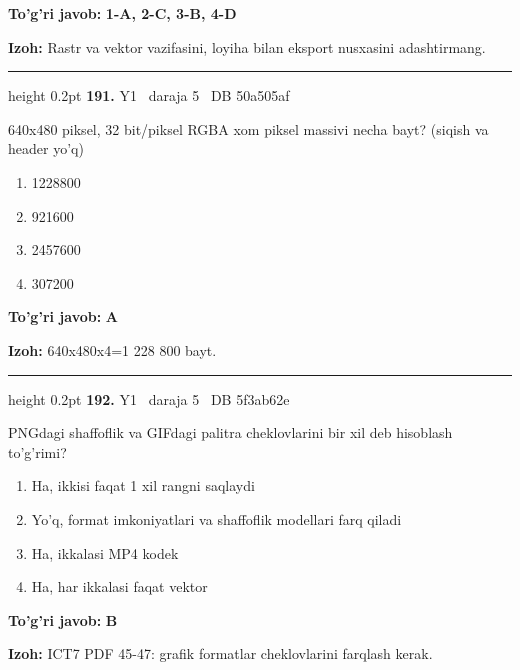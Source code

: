 \documentclass[10pt,a4paper,oneside]{article}
\begin{document}
\begin{tcolorbox}[enhanced,breakable,colback=teal!4,colframe=teal!45!black,boxrule=0.45pt,arc=1.2mm,left=2.8mm,right=2.8mm,top=2mm,bottom=2mm,before skip=2mm,after skip=2mm]
\textbf{\color{teal}To'g'ri javob:} \textbf{1-A, 2-C, 3-B, 4-D}
\par\smallskip
\textbf{Izoh:} Rastr va vektor vazifasini, loyiha bilan eksport nusxasini adashtirmang.
\end{tcolorbox}
\vspace{2mm}\hrule height 0.2pt \vspace{4mm}
\hypertarget{q191}{\textbf{\color{ink}191.}}  {\color{muted}\scriptsize Y1 \textbullet\ daraja 5 \textbullet\ DB 50a505af}
\par
640x480 piksel, 32 bit/piksel RGBA xom piksel massivi necha bayt? (siqish va header yo'q)
\begin{enumerate}[label=\Alph*),leftmargin=9mm]
\item 1228800
\item 921600
\item 2457600
\item 307200
\end{enumerate}
\begin{tcolorbox}[enhanced,breakable,colback=teal!4,colframe=teal!45!black,boxrule=0.45pt,arc=1.2mm,left=2.8mm,right=2.8mm,top=2mm,bottom=2mm,before skip=2mm,after skip=2mm]
\textbf{\color{teal}To'g'ri javob:} \textbf{A}
\par\smallskip
\textbf{Izoh:} 640x480x4=1 228 800 bayt.
\end{tcolorbox}
\vspace{2mm}\hrule height 0.2pt \vspace{4mm}
\hypertarget{q192}{\textbf{\color{ink}192.}}  {\color{muted}\scriptsize Y1 \textbullet\ daraja 5 \textbullet\ DB 5f3ab62e}
\par
PNGdagi shaffoflik va GIFdagi palitra cheklovlarini bir xil deb hisoblash to'g'rimi?
\begin{enumerate}[label=\Alph*),leftmargin=9mm]
\item Ha, ikkisi faqat 1 xil rangni saqlaydi
\item Yo'q, format imkoniyatlari va shaffoflik modellari farq qiladi
\item Ha, ikkalasi MP4 kodek
\item Ha, har ikkalasi faqat vektor
\end{enumerate}
\begin{tcolorbox}[enhanced,breakable,colback=teal!4,colframe=teal!45!black,boxrule=0.45pt,arc=1.2mm,left=2.8mm,right=2.8mm,top=2mm,bottom=2mm,before skip=2mm,after skip=2mm]
\textbf{\color{teal}To'g'ri javob:} \textbf{B}
\par\smallskip
\textbf{Izoh:} ICT7 PDF 45-47: grafik formatlar cheklovlarini farqlash kerak.
\end{tcolorbox}
\end{document}
